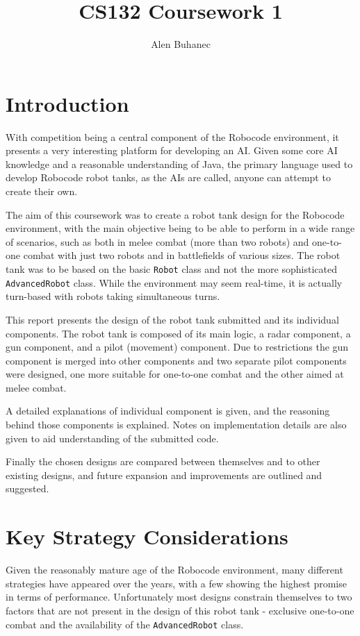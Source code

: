 \documentclass[11pt]{report}
\title{CS132 Coursework 1}
\author{Alen Buhanec}
\date{}
\begin{document}
\maketitle
\tableofcontents
\chapter{Introduction} %
With competition being a central component of the Robocode environment, it presents a very interesting platform for developing an AI. Given some core AI knowledge and a reasonable understanding of Java, the primary language used to develop Robocode robot tanks, as the AIs are called, anyone can attempt to create their own.

The aim of this coursework was to create a robot tank design for the Robocode environment, with the main objective being to be able to perform in a wide range of scenarios, such as both in melee combat (more than two robots) and one-to-one combat with just two robots and in battlefields of various sizes. The robot tank was to be based on the basic \texttt{Robot} class and not the more sophisticated \texttt{AdvancedRobot} class. While the environment may seem real-time, it is actually turn-based with robots taking simultaneous turns. %

This report presents the design of the robot tank submitted and its individual components. The robot tank is composed of its main logic, a radar component, a gun component, and a pilot (movement) component. Due to restrictions the gun component is merged into other components and two separate pilot components were designed, one more suitable for one-to-one combat and the other aimed at melee combat.

A detailed explanations of individual component is given, and the reasoning behind those components is explained. Notes on implementation details are also given to aid understanding of the submitted code.

Finally the chosen designs are compared between themselves and to other existing designs, and future expansion and improvements are outlined and suggested.

\chapter{Key Strategy Considerations} %

Given the reasonably mature age of the Robocode environment, many different strategies have appeared over the years, with a few showing the highest promise in terms of performance. Unfortunately most designs constrain themselves to two factors that are not present in the design of this robot tank - exclusive one-to-one combat and the availability of the \texttt{AdvancedRobot} class.
\end{document}
